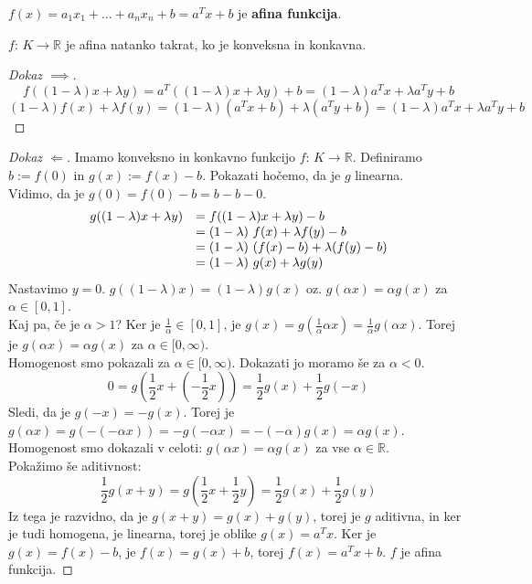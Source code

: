 \documentclass[11pt, a4paper]{article}
\begin{document}
    \begin{definition}
        \(f(x)=a_1 x_1 + ... + a_n x_n + b = a^T x + b\) je \textbf{afina funkcija}.
    \end{definition}

    \begin{proposition}
        \(f\): \(K \to \mathbb{R}\) je afina natanko takrat, ko je konveksna in konkavna.
    \end{proposition}

    \begin{proof}[Dokaz \(\implies\)]
        \[
            f((1-\lambda) x + \lambda y) = a^T ((1-\lambda) x + \lambda y) + b = (1-\lambda) a^T x + \lambda a^T y + b    
        \]
        \[
            (1-\lambda) f(x) + \lambda f(y) = (1-\lambda) (a^T x + b) + \lambda (a^T y + b) = (1-\lambda) a^T x + \lambda a^T y + b     
        \]
    \end{proof}
    
    \begin{proof}[Dokaz \(\Longleftarrow\)]
        Imamo konveksno in konkavno funkcijo \(f\): \(K \to \mathbb{R}\). Definiramo \(b := f(0)\) in \(g(x) := f(x) - b\). Pokazati hočemo, da je \(g\) linearna. \\
        Vidimo, da je \(g(0)=f(0)-b = b-b - 0\). \\
        \[
            \begin{array}{l l}
                g((1-\lambda) x + \lambda y) & = f((1-\lambda) x + \lambda y) - b \\
                & = (1-\lambda)\ f(x) + \lambda f(y) - b \\
                & = (1-\lambda)\ (f(x) - b) + \lambda (f(y) - b) \\
                & = (1-\lambda)\ g(x) + \lambda g(y)
            \end{array}    
        \]
        Nastavimo \(y = 0\). \(g((1-\lambda) x) = (1-\lambda) g(x)\) oz. \(g(\alpha x) = \alpha g(x)\) za \(\alpha \in [0,1]\). \\
        Kaj pa, če je \(\alpha > 1\)? Ker je \(\frac{1}{\alpha} \in  [0,1]\), je \(g(x) = g(\frac{1}{\alpha} \alpha x) = \frac{1}{\alpha} g(\alpha x)\). Torej je \(g(\alpha x) = \alpha g(x)\) za \(\alpha \in [0, \infty)\). \\
        Homogenost smo pokazali za \(\alpha \in [0, \infty)\). Dokazati jo moramo še za \(\alpha < 0\).
        \[
            0 = g(\frac{1}{2} x + (-\frac{1}{2} x)) = \frac{1}{2} g(x) + \frac{1}{2} g(-x)    
        \]
        Sledi, da je \(g(-x)=-g(x)\). Torej je \(g(\alpha x) = g(- (-\alpha x)) = - g(-\alpha x) = - (-\alpha) g(x) = \alpha g(x)\). \\
        Homogenost smo dokazali v celoti: \(g(\alpha x) = \alpha g(x)\) za vse \(\alpha \in \mathbb{R}\). \\
        Pokažimo še aditivnost:
        \[
            \frac{1}{2} g(x + y) = g(\frac{1}{2} x + \frac{1}{2} y) = \frac{1}{2} g(x) + \frac{1}{2} g(y)
        \]
        Iz tega je razvidno, da je \(g(x + y) = g(x) + g(y)\), torej je \(g\) aditivna, in ker je tudi homogena, je linearna, torej je oblike \(g(x) = a^T x\). Ker je \(g(x) = f(x) - b\), je \(f(x) = g(x) + b\), torej \(f(x) = a^T x + b\). \(f\) je afina funkcija.
    \end{proof}
    
\end{document}
